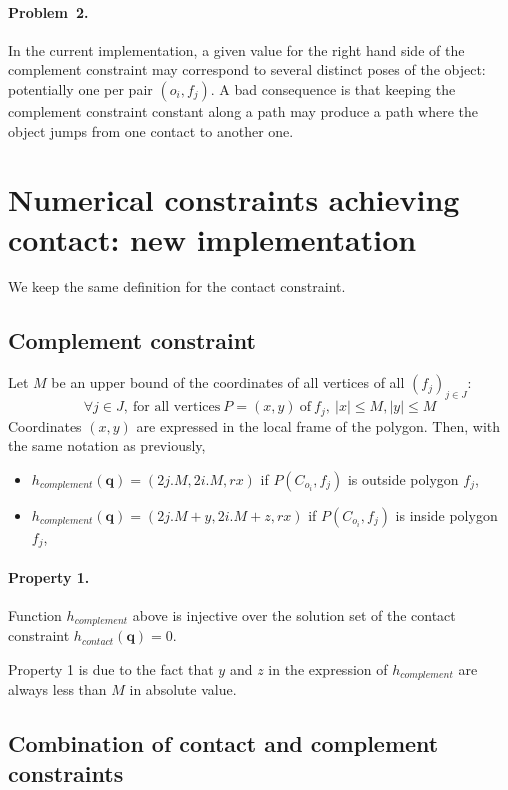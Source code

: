 \documentclass {article}
\newcommand\conf{\mathbf{q}}
\begin{document}
\paragraph{Problem~2.}
In the current implementation, a given value for the right hand side
of the complement constraint may correspond to several distinct poses
of the object: potentially one per pair $(o_i, f_j)$. A bad
consequence is that keeping the complement constraint constant along a
path may produce a path where the object jumps from one contact to
another one.

\section{Numerical constraints achieving contact: new implementation}

We keep the same definition for the contact constraint.

\subsection{Complement constraint}

Let $M$ be an upper bound of the coordinates of all vertices of all $(f_j)_{j\in J}$:
$$
\forall j\in J,\ \mbox{for all vertices}\ P = (x,y) \ \mbox{of} \ f_j,
\ |x| \leq M, |y| \leq M
$$
Coordinates $(x,y)$ are expressed in the local frame of the polygon. Then, with
the same notation as previously,
\begin{itemize}
\item $h_{complement}(\conf) = (2j.M, 2i.M,rx)$ if $P(C_{o_i},f_j)$ is outside
  polygon $f_j$,
\item $h_{complement}(\conf) = (2j.M + y, 2i.M + z,rx)$ if $P(C_{o_i},f_j)$ is
  inside polygon $f_j$,
\end{itemize}

\paragraph{Property 1.} Function $h_{complement}$ above is injective over the
solution set of the contact constraint $h_{contact}(\conf)=0$.

Property 1 is due to the fact that $y$ and $z$ in the expression of $h_{complement}$ are always less than $M$ in absolute value.

\subsection {Combination of contact and complement constraints}
\end{document}
